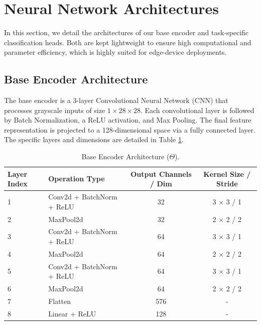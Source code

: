 \documentclass{article}
\theoremstyle{plain}
\theoremstyle{definition}
\theoremstyle{remark}
\begin{document}
\section{Neural Network Architectures}
In this section, we detail the architectures of our base encoder and task-specific classification heads. Both are kept lightweight to ensure high computational and parameter efficiency, which is highly suited for edge-device deployments.

\subsection{Base Encoder Architecture}
The base encoder is a 3-layer Convolutional Neural Network (CNN) that processes grayscale inputs of size $1 \times 28 \times 28$. Each convolutional layer is followed by Batch Normalization, a ReLU activation, and Max Pooling. The final feature representation is projected to a 128-dimensional space via a fully connected layer. The specific layers and dimensions are detailed in Table \ref{tab:encoder_architecture}.

\begin{table}[h]
\caption{Base Encoder Architecture ($\Theta$).}
\label{tab:encoder_architecture}
\begin{center}
\begin{tabular}{llcc}
\toprule
Layer Index & Operation Type & Output Channels / Dim & Kernel Size / Stride \\
\midrule
1 & Conv2d + BatchNorm + ReLU & 32 & 3 $\times$ 3 / 1 \\
2 & MaxPool2d & 32 & 2 $\times$ 2 / 2 \\
3 & Conv2d + BatchNorm + ReLU & 64 & 3 $\times$ 3 / 1 \\
4 & MaxPool2d & 64 & 2 $\times$ 2 / 2 \\
5 & Conv2d + BatchNorm + ReLU & 64 & 3 $\times$ 3 / 1 \\
6 & MaxPool2d & 64 & 2 $\times$ 2 / 2 \\
7 & Flatten & 576 & - \\
8 & Linear + ReLU & 128 & - \\
\bottomrule
\end{tabular}
\end{center}
\end{table}
\end{document}
